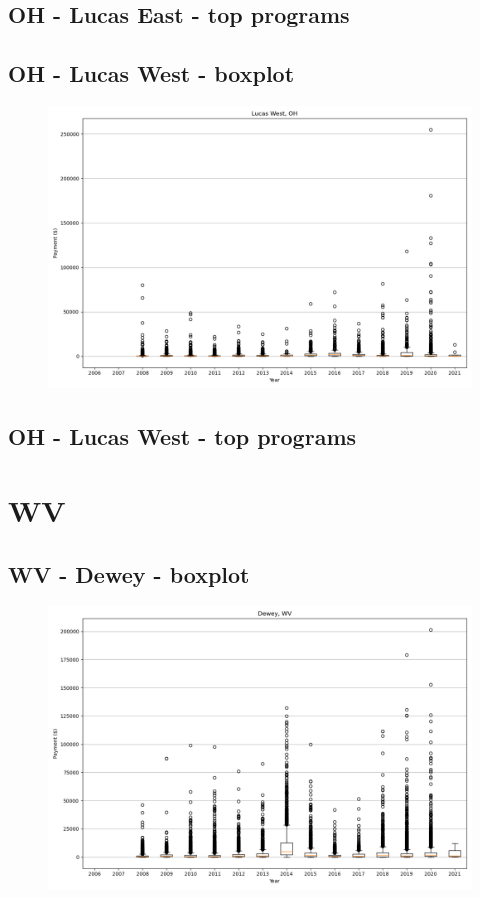 \subsection*{OH - Lucas East - top programs}

\newpage
\subsection*{OH - Lucas West - boxplot}
\begin{figure}[h]
\centering
\includegraphics[width=7in]{../output/boxplots/counties/Lucas West-OH_boxplot.png}
\end{figure}


\subsection*{OH - Lucas West - top programs}

\newpage
\section*{WV}
\subsection*{WV - Dewey - boxplot}
\begin{figure}[h]
\centering
\includegraphics[width=7in]{../output/boxplots/counties/Dewey-WV_boxplot.png}
\end{figure}


